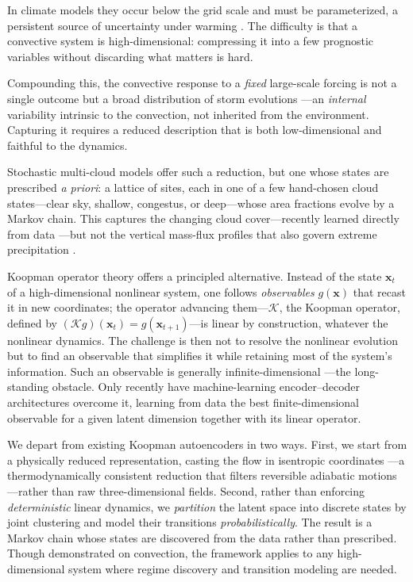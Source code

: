 \documentclass[
    aps,
    prl,
    reprint,
    superscriptaddress,
    amsmath,amssymb,
    floatfix,
    nofootinbib
]{revtex4-2}
\begin{document}
In climate models they occur below the grid scale and must be parameterized, a persistent source of uncertainty under warming \cite{yang2023impact, bolot2025no}. The difficulty is that a convective system is high-dimensional: compressing it into a few prognostic variables without discarding what matters is hard.

Compounding this, the convective response to a \emph{fixed} large-scale forcing is not a single outcome but a broad distribution of storm evolutions \cite{abramian2025key, feng2025mesoscale, hu2020observed, fiolleau2024database}---an \emph{internal} variability intrinsic to the convection, not inherited from the environment. Capturing it requires a reduced description that is both low-dimensional and faithful to the dynamics.

Stochastic multi-cloud models \cite{khouider2006multicloud, majda2008stochastic, khouider2010stochastic} offer such a reduction, but one whose states are prescribed \emph{a priori}: a lattice of sites, each in one of a few hand-chosen cloud states---clear sky, shallow, congestus, or deep---whose area fractions evolve by a Markov chain. This captures the changing cloud cover---recently learned directly from data \cite{shamekh2026raintype}---but not the vertical mass-flux profiles that also govern extreme precipitation \cite{MullerYukari19, singh2012upward, abramian2023extreme, wang2022convective, li2025bimodal}.

Koopman operator theory \cite{koopman1931hamiltonian, brunton2021modern} offers a principled alternative. Instead of the state $\mathbf{x}_t$ of a high-dimensional nonlinear system, one follows \emph{observables} $g(\mathbf{x})$ that recast it in new coordinates; the operator advancing them---$\mathcal{K}$, the Koopman operator, defined by $(\mathcal{K}g)(\mathbf{x}_t) = g(\mathbf{x}_{t+1})$---is linear by construction, whatever the nonlinear dynamics. The challenge is then not to resolve the nonlinear evolution but to find an observable that simplifies it while retaining most of the system's information. Such an observable is generally infinite-dimensional \cite{brunton2021modern}---the long-standing obstacle. Only recently have machine-learning encoder--decoder architectures \cite{lusch2018deep, nathaniel2026generative} overcome it, learning from data the best finite-dimensional observable for a given latent dimension together with its linear operator.

We depart from existing Koopman autoencoders in two ways. First, we start from a physically reduced representation, casting the flow in isentropic coordinates \cite{pauluis2013isentropic}---a thermodynamically consistent reduction that filters reversible adiabatic motions---rather than raw three-dimensional fields. Second, rather than enforcing \emph{deterministic} linear dynamics, we \emph{partition} the latent space into discrete states by joint clustering \cite{kaiser2014cluster, souza2024representing} and model their transitions \emph{probabilistically}. The result is a Markov chain whose states are discovered from the data rather than prescribed. Though demonstrated on convection, the framework applies to any high-dimensional system where regime discovery and transition modeling are needed.
\end{document}
